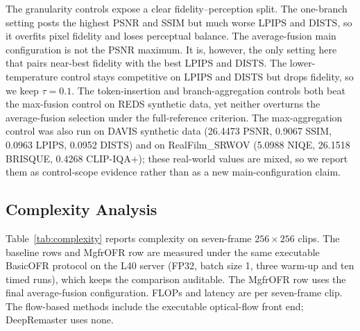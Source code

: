 The granularity controls expose a clear fidelity--perception split. The one-branch setting posts the highest PSNR and SSIM but much worse LPIPS and DISTS, so it overfits pixel fidelity and loses perceptual balance. The average-fusion main configuration is not the PSNR maximum. It is, however, the only setting here that pairs near-best fidelity with the best LPIPS and DISTS. The lower-temperature control stays competitive on LPIPS and DISTS but drops fidelity, so we keep $\tau=0.1$. The token-insertion and branch-aggregation controls both beat the max-fusion control on REDS synthetic data, yet neither overturns the average-fusion selection under the full-reference criterion. The max-aggregation control was also run on DAVIS synthetic data (26.4473 PSNR, 0.9067 SSIM, 0.0963 LPIPS, 0.0952 DISTS) and on RealFilm\_SRWOV (5.0988 NIQE, 26.1518 BRISQUE, 0.4268 CLIP-IQA+); these real-world values are mixed, so we report them as control-scope evidence rather than as a new main-configuration claim.

\FloatBarrier

\subsection{Complexity Analysis}
\label{subsec:complexity}

Table~\ref{tab:complexity} reports complexity on seven-frame $256{\times}256$ clips. The baseline rows and MgfrOFR row are measured under the same executable BasicOFR protocol on the L40 server (FP32, batch size 1, three warm-up and ten timed runs), which keeps the comparison auditable. The MgfrOFR row uses the final average-fusion configuration. FLOPs and latency are per seven-frame clip. The flow-based methods include the executable optical-flow front end; DeepRemaster uses none.

